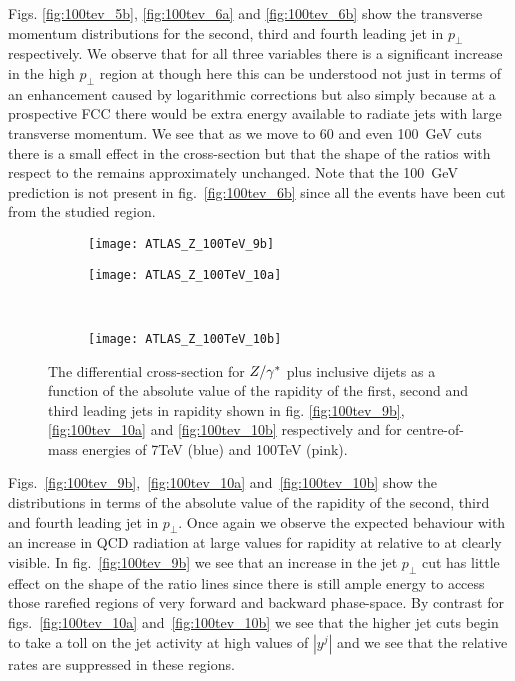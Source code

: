	Figs. \eqref{fig:100tev_5b}, \eqref{fig:100tev_6a} and \eqref{fig:100tev_6b} show the transverse momentum
	distributions for the second, third and fourth leading jet in $p_\perp$ respectively.  We observe that for all three
	variables there is a significant increase in the high $p_\perp$ region at \htev though here this can be understood
	not just in terms of an enhancement caused by logarithmic corrections but also simply because at a prospective FCC
	there would be extra energy available to radiate jets with large transverse momentum.  We see that as we move to
	60 and even 100~GeV cuts there is a small effect in the cross-section but that the shape of the ratios with respect
	to the \stev remains approximately unchanged.  Note that the 100~GeV prediction is not present in
	fig.~\eqref{fig:100tev_6b} since all the events have been cut from the studied region.

	\begin{figure}[bth]
		\centering
		\begin{subfigure}[b]{0.48\textwidth}
			\texttt{[image: ATLAS\_Z\_100TeV\_9b]}
			\caption{}
			\label{fig:100tev_9b}
		\end{subfigure}

		\begin{subfigure}[b]{0.48\textwidth}
			\texttt{[image: ATLAS\_Z\_100TeV\_10a]}
			\caption{}
			\label{fig:100tev_10a}
		\end{subfigure}
		~
		\begin{subfigure}[b]{0.48\textwidth}
			\texttt{[image: ATLAS\_Z\_100TeV\_10b]}
			\caption{}
			\label{fig:100tev_10b}
		\end{subfigure}
		\caption{The differential cross-section for $Z/\gamma^*$ plus inclusive dijets as a function of the absolute value of the rapidity
		         of the first, second and third leading jets in rapidity shown in fig. \eqref{fig:100tev_9b}, \eqref{fig:100tev_10a}
		         and \eqref{fig:100tev_10b} respectively and for centre-of-mass energies of 7TeV (blue) and 100TeV (pink).}
	\end{figure}

	Figs.~\eqref{fig:100tev_9b},~\eqref{fig:100tev_10a} and~\eqref{fig:100tev_10b} show the distributions in terms of
	the absolute value of the rapidity of the second, third and fourth leading jet in $p_\perp$.  Once again we observe
	the expected behaviour with an increase in QCD radiation at large values for rapidity at \htev relative to at \stev
	clearly visible.  In fig.~\eqref{fig:100tev_9b} we see that an increase in the jet $p_\perp$ cut has little effect
	on the shape of the ratio lines since there is still ample energy to access those rarefied regions of very forward
	and backward phase-space.  By contrast for figs.~\eqref{fig:100tev_10a} and~\eqref{fig:100tev_10b} we see that the
	higher jet cuts begin to take a toll on the jet activity at high values of $|y^j|$ and we see that the relative
	rates are suppressed in these regions.

